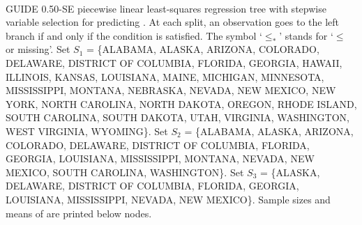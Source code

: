 \documentclass{article}
\begin{document}
\begin{landscape}
\begin{center}
{{{{{    ~{}
    ~{}
   }
   }
    ~{}
   }
   }
 }
 \end{center}
GUIDE  0.50-SE piecewise linear least-squares regression tree with stepwise variable selection
for predicting \texttt{}.
At each split, an observation goes to the left branch 
 if and only if the condition is satisfied.
 The symbol `$\leq_*$' stands for `$\leq$ or missing'.
Set $S_{1}$ = \{ALABAMA, ALASKA, ARIZONA, COLORADO, DELAWARE,
 DISTRICT OF COLUMBIA, FLORIDA, GEORGIA, HAWAII, ILLINOIS, KANSAS, LOUISIANA,
 MAINE, MICHIGAN, MINNESOTA, MISSISSIPPI, MONTANA, NEBRASKA, NEVADA,
 NEW MEXICO, NEW YORK, NORTH CAROLINA, NORTH DAKOTA, OREGON, RHODE ISLAND,
 SOUTH CAROLINA, SOUTH DAKOTA, UTAH, VIRGINIA, WASHINGTON, WEST VIRGINIA,
 WYOMING\}.
Set $S_{2}$ = \{ALABAMA, ALASKA, ARIZONA, COLORADO, DELAWARE,
 DISTRICT OF COLUMBIA, FLORIDA, GEORGIA, LOUISIANA, MISSISSIPPI, MONTANA,
 NEVADA, NEW MEXICO, SOUTH CAROLINA, WASHINGTON\}.
Set $S_{3}$ = \{ALASKA, DELAWARE, DISTRICT OF COLUMBIA, FLORIDA, GEORGIA,
 LOUISIANA, MISSISSIPPI, NEVADA, NEW MEXICO\}.
Sample sizes and means of \texttt{} are printed below nodes.
 \end{landscape}
 
\end{document}
